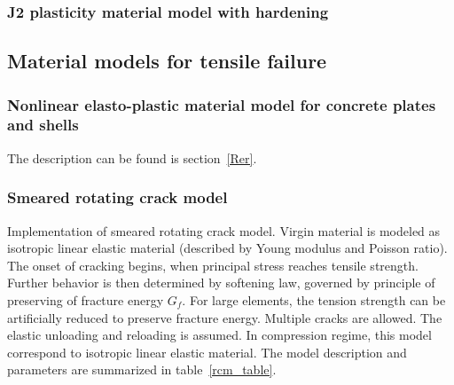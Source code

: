 \documentclass[epsf,a4paper]{article}
\begin{document}
\subsubsection{J2 plasticity material model with hardening}

\subsection{Material models for tensile failure}
\subsubsection{Nonlinear elasto-plastic material model for concrete
plates and shells}
The description can be found is section~\ref{Rer}.

\subsubsection{Smeared rotating crack model}
\label{rcm}
Implementation of smeared rotating crack model. 
Virgin material is modeled as isotropic linear elastic material
(described by Young modulus and Poisson
ratio). The onset of cracking begins, when principal stress reaches
tensile strength. 
Further behavior is then determined by softening law, 
governed by principle of preserving of fracture
energy $G_f$. For large elements, the tension strength can be
artificially reduced
to preserve fracture energy. Multiple cracks are allowed. 
The elastic unloading and reloading is assumed. 
In compression regime, this model correspond to isotropic linear elastic material.
The model description and parameters are summarized
in table~\ref{rcm_table}.
\end{document}
